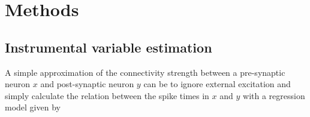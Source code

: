 \documentclass[11pt]{article}
\begin{document}


\section{Methods}
\subsection{Instrumental variable estimation}
A simple approximation of the connectivity strength between a pre-synaptic neuron $ x $ and post-synaptic neuron $ y $ can be to ignore external excitation and simply calculate the relation between the spike times in $ x $ and $ y $ with a regression model given by
\end{document}
